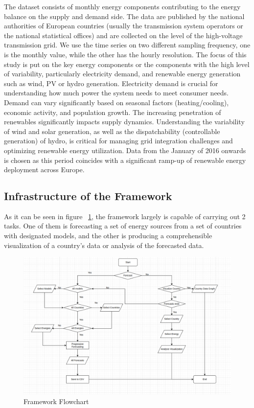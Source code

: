 \documentclass[]{usiinfbachelorproject}
\begin{document}
The dataset consists of monthly energy components contributing to the energy balance on the supply and demand side. The data are published by the national authorities of European countries (usually the transmission system operators or the national statistical offices) and are collected on the level of the high-voltage transmission grid. We use the time series on two different sampling frequency, one is the monthly value, while the other has the hourly resolution. The focus of this study is put on the key energy components or the components with the high level of variability, particularly electricity demand, and renewable energy generation such as wind, PV or hydro generation.  Electricity demand  is crucial for understanding how much power the system needs to meet consumer needs. Demand can vary significantly based on seasonal factors (heating/cooling), economic activity, and population growth. The increasing penetration of renewables significantly impacts supply dynamics. Understanding the variability of wind and solar generation, as well as the dispatchability (controllable generation) of hydro, is critical for managing grid integration challenges and optimizing renewable energy utilization. Data from the January of 2016 onwards is chosen as this period coincides with a significant ramp-up of renewable energy deployment across Europe. \\

\subsection{Infrastructure of the Framework}

As it can be seen in figure ~\ref{fig:framework}, the framework largely is capable of carrying out 2 tasks. One of them is forecasting a set of energy sources from a set of countries with designated models, and the other is producing a comprehensible visualization of a country's data or analysis of the forecasted data. \\ 

\begin{figure}[htp!]
    \centering
    \includegraphics[width=0.5\linewidth]{figures/flowchart.png}
    \caption{Framework Flowchart}
    \label{fig:framework} %
\end{figure}
\end{document}
